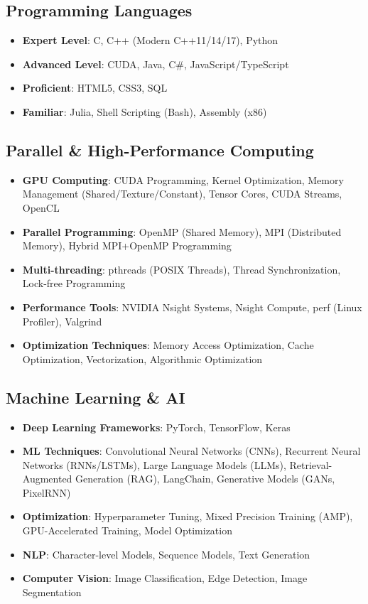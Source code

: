 \documentclass[a4paper,12pt]{article}
\begin{document}
\subsection*{Programming Languages}
\begin{itemize}[nosep,after=\strut, leftmargin=1em, itemsep=1pt]
\item \textbf{Expert Level}: C, C++ (Modern C++11/14/17), Python
\item \textbf{Advanced Level}: CUDA, Java, C\#, JavaScript/TypeScript
\item \textbf{Proficient}: HTML5, CSS3, SQL
\item \textbf{Familiar}: Julia, Shell Scripting (Bash), Assembly (x86)
\end{itemize}

\subsection*{Parallel \& High-Performance Computing}
\begin{itemize}[nosep,after=\strut, leftmargin=1em, itemsep=1pt]
\item \textbf{GPU Computing}: CUDA Programming, Kernel Optimization, Memory Management (Shared/Texture/Constant), Tensor Cores, CUDA Streams, OpenCL
\item \textbf{Parallel Programming}: OpenMP (Shared Memory), MPI (Distributed Memory), Hybrid MPI+OpenMP Programming
\item \textbf{Multi-threading}: pthreads (POSIX Threads), Thread Synchronization, Lock-free Programming
\item \textbf{Performance Tools}: NVIDIA Nsight Systems, Nsight Compute, perf (Linux Profiler), Valgrind
\item \textbf{Optimization Techniques}: Memory Access Optimization, Cache Optimization, Vectorization, Algorithmic Optimization
\end{itemize}

\subsection*{Machine Learning \& AI}
\begin{itemize}[nosep,after=\strut, leftmargin=1em, itemsep=1pt]
\item \textbf{Deep Learning Frameworks}: PyTorch, TensorFlow, Keras
\item \textbf{ML Techniques}: Convolutional Neural Networks (CNNs), Recurrent Neural Networks (RNNs/LSTMs), Large Language Models (LLMs), Retrieval-Augmented Generation (RAG), LangChain, Generative Models (GANs, PixelRNN)
\item \textbf{Optimization}: Hyperparameter Tuning, Mixed Precision Training (AMP), GPU-Accelerated Training, Model Optimization
\item \textbf{NLP}: Character-level Models, Sequence Models, Text Generation
\item \textbf{Computer Vision}: Image Classification, Edge Detection, Image Segmentation
\end{itemize}
\end{document}
